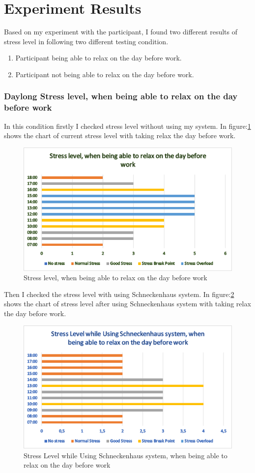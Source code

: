 \section{Experiment Results}
Based on my experiment with the participant, I found two different results of stress level in following two different testing condition.
\begin{enumerate}
    \item Participant being able to relax on the day before work.
    \item Participant not being able to relax on the day before work.
\end{enumerate}
\subsubsection*{Daylong Stress level, when being able to relax on the day before work}
In this condition firstly I checked stress level without using my system. In figure:\ref{fig:st1} shows the chart of current stress level with taking relax the day before work.
\begin{figure}[h] 
  \centering
  \includegraphics[width=.7\linewidth]{chap5/st1.png}
  \caption[Stress level, when being able to relax on the day before work]{Stress level, when being able to relax on the day before work}
  \label{fig:st1}
\end{figure}

Then I checked the stress level with using Schneckenhaus system. In figure:\ref{fig:st3} shows the chart of stress level after using Schneckenhaus system with taking relax the day before work.
\begin{figure}[ht] 
  \centering
  \includegraphics[width=.8\linewidth]{chap5/st3.png}
  \caption[Stress Level while Using Schneckenhaus system, when being able to relax on the day before work
]{Stress Level while Using Schneckenhaus system, when being able to relax on the day before work
}
  \label{fig:st3}
\end{figure}
